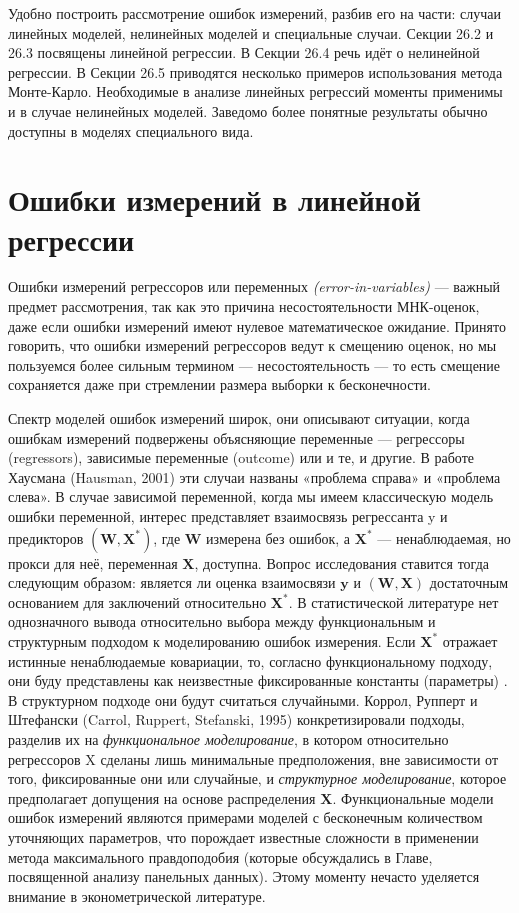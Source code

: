 Удобно построить рассмотрение ошибок измерений, разбив его на части: случаи линейных моделей, нелинейных моделей и специальные случаи. Секции 26.2 и 26.3 посвящены линейной регрессии. В Секции 26.4 речь идёт о нелинейной регрессии. В Секции 26.5 приводятся несколько примеров использования метода Монте-Карло.  Необходимые в анализе линейных регрессий моменты применимы и в случае нелинейных моделей. Заведомо более понятные результаты обычно доступны в моделях специального вида.

\section{Ошибки измерений в линейной регрессии}
Ошибки измерений регрессоров или { переменных} \emph{(error-in-variables)} --- важный предмет рассмотрения, так как это причина несостоятельности МНК-оценок, даже если ошибки измерений имеют нулевое математическое ожидание. Принято говорить, что ошибки измерений регрессоров ведут к смещению оценок, но мы пользуемся более сильным термином --- несостоятельность --- то есть смещение сохраняется даже при стремлении размера выборки к бесконечности.

Спектр моделей ошибок измерений широк, они описывают ситуации, когда ошибкам измерений подвержены объясняющие переменные --- регрессоры (regressors), зависимые переменные (outcome) или и те, и другие. В работе Хаусмана (Hausman, 2001) эти случаи названы «проблема справа» и «проблема слева». В случае зависимой переменной, когда мы имеем классическую модель ошибки переменной,  интерес представляет взаимосвязь регрессанта y и предикторов $(\mathbf{W}, \mathbf{X^*})$, где $\mathbf{W}$ измерена без ошибок, а $\mathbf{X^*}$ --- ненаблюдаемая, но прокси для неё, переменная $\mathbf{X}$, доступна. Вопрос исследования ставится тогда следующим образом: является ли оценка взаимосвязи $\mathbf{y}$ и $(\mathbf{W}, \mathbf{X})$ достаточным основанием для заключений относительно $\mathbf{X^*}$.
В статистической литературе  нет однозначного вывода относительно выбора между функциональным и структурным подходом к моделированию ошибок измерения. Если $\mathbf{X^*}$ отражает истинные ненаблюдаемые ковариации, то, согласно функциональному подходу, они буду представлены как неизвестные фиксированные константы (параметры) . В структурном подходе они будут считаться случайными. Коррол, Рупперт и Штефански (Carrol, Ruppert, Stefanski, 1995) конкретизировали подходы, разделив их на \emph{функциональное моделирование}, в котором относительно регрессоров X сделаны лишь минимальные предположения, вне зависимости от того, фиксированные они или случайные, и \emph{структурное моделирование}, которое предполагает допущения на основе распределения $\mathbf{X}$. Функциональные модели ошибок измерений являются примерами моделей с бесконечным количеством уточняющих параметров, что порождает известные сложности в применении метода максимального правдоподобия (которые обсуждались в Главе, посвященной анализу панельных данных). Этому моменту нечасто уделяется внимание в эконометрической литературе.

